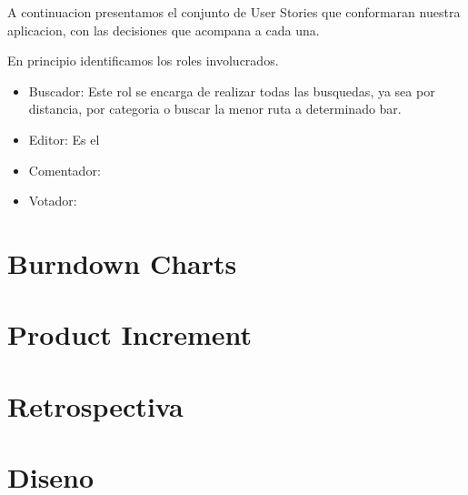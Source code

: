 \documentclass[10pt,a4paper]{article}
\begin{document}
A continuacion presentamos el conjunto de User Stories que conformaran nuestra aplicacion, con las decisiones que acompana a cada una.

En principio identificamos los roles involucrados.
\begin{itemize}
 \item Buscador: Este rol se encarga de realizar todas las busquedas, ya sea por distancia, por categoria o buscar la menor ruta a determinado bar.
 \item Editor: Es el 
 \item Comentador:
 \item Votador:
 
 
\end{itemize}


\section{Burndown Charts}

\section{Product Increment}

\section{Retrospectiva}

\section{Diseno}
\end{document}
